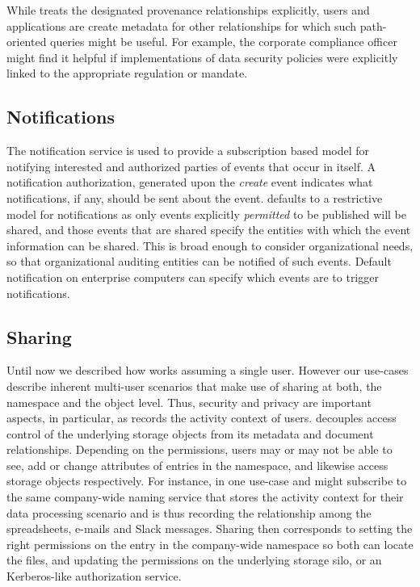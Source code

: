 While \system treats the designated provenance relationships explicitly, users and applications are create metadata for other relationships for which such path-oriented queries might be useful.
For example, the corporate compliance officer might find it helpful if implementations of data security policies were explicitly linked to the appropriate regulation or mandate.

\subsection{Notifications}
\label{sec:notifications}

The notification service is used to provide a subscription based model for notifying interested and authorized parties of events that occur in \system itself. A notification authorization, generated upon the \emph{create} event indicates what notifications, if any, should be sent about the event. \system defaults to a restrictive model for notifications as only events explicitly \textit{permitted} to be published will be shared, and those events that are shared specify the entities with which the event information can be shared.  This is broad enough to consider organizational needs, so that organizational auditing entities can be notified of such events.  Default notification on enterprise computers can specify which events are to trigger notifications.

\subsection{Sharing}
\label{sec:sharing}
Until now we described how \system works assuming a single user. However our use-cases describe inherent multi-user scenarios that make use of sharing at both, the namespace and the object level. Thus, security and privacy are important aspects, in particular, as \system records the activity context of users. \system decouples access control of the underlying storage objects from its metadata and document relationships. Depending on the permissions, users may or may not be able to see, add or change attributes of entries in the namespace, and likewise access storage objects respectively. For instance, in one use-case \persa and \persc might subscribe to the same company-wide naming service that stores the activity context for their data processing scenario and is thus recording the relationship among the spreadsheets, e-mails and Slack messages. Sharing then corresponds to setting the right permissions on the entry in the company-wide namespace so both can locate the files, and updating the permissions on the underlying storage silo, or an Kerberos-like authorization service.